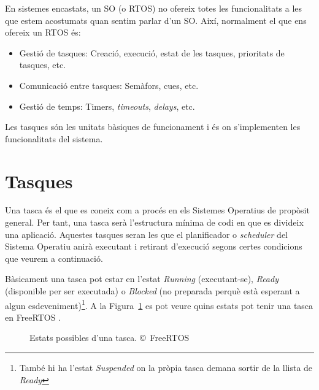 En sistemes encastats, un SO (o RTOS) no ofereix totes les funcionalitats a les que estem acostumats quan sentim parlar d'un SO. Així, normalment el que ens ofereix un RTOS és:

\begin{itemize}
 \item Gestió de tasques: Creació, execució, estat de les tasques, prioritats de tasques, etc.
 \item Comunicació entre tasques: Semàfors, cues, etc.
 \item Gestió de temps: Timers, {\em timeouts}, {\em delays}, etc.
\end{itemize}

Les tasques són les unitats bàsiques de funcionament i és on s'implementen les funcionalitats del sistema.

\section{Tasques}

Una tasca és el que es coneix com a procés en els Sistemes Operatius de propòsit general. Per tant, una tasca serà l'estructura mínima de codi en que es divideix una aplicació. Aquestes tasques seran les que el planificador o {\em scheduler} del Sistema Operatiu anirà executant i retirant d'execució segons certes condicions que veurem a continuació.

Bàsicament una tasca pot estar en l'estat {\em Running} (executant-se), {\em Ready} (disponible per ser executada) o {\em Blocked} (no preparada perquè està esperant a algun esdeveniment)\footnote{També hi ha l'estat {\em Suspended} on la pròpia tasca demana sortir de la llista de {\em Ready}}. A la Figura~\ref{fig:taskstate} es pot veure quins estats pot tenir una tasca en FreeRTOS \cite[92]{FreeRTOSBook}.


\begin{figure}
 \centering
 \caption{Estats possibles d'una tasca. \copyright\ FreeRTOS}
 \label{fig:taskstate}
\end{figure}

